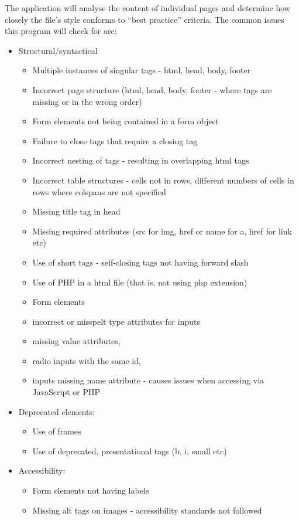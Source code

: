 \documentclass[12pt]{article}
\begin{document}
The application will analyse the content of individual pages and determine how closely the file's style conforms to ``best practice'' criteria. The common issues this program will check for are:
\begin{itemize}
\item Structural/syntactical
\begin{itemize}
\item Multiple instances of singular tags - html, head, body, footer
\item Incorrect page structure (html, head, body, footer - where tags are missing or in the wrong order)
\item Form elements not being contained in a form object
\item Failure to close tags that require a closing tag
\item Incorrect nesting of tags - resulting in overlapping html tags
\item Incorrect table structures - cells not in rows, different numbers of cells in rows where colspans are not specified
\item Missing title tag in head
\item Missing required attributes (src for img, href or name for a, href for link etc)
\item Use of short tags - self-closing tags not having forward slash
\item Use of PHP in a html file (that is, not using php extension)
\item Form elements
\item incorrect or misspelt type attributes for inputs
\item missing value attributes,
\item radio inputs with the same id,
\item inputs missing name attribute - causes issues when accessing via \\ JavaScript or PHP
\end{itemize}
\item Deprecated elements:
\begin{itemize}
\item Use of frames
\item Use of deprecated, presentational tags (b, i, small etc)
\end{itemize}
\item Accessibility:
\begin{itemize}
\item Form elements not having labels
\item Missing alt tags on images - accessibility standards not followed

\end{itemize}
\end{itemize}
\end{document}
